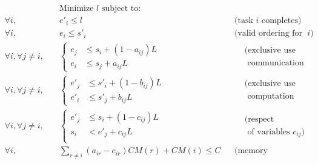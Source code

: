 \documentclass[sigconf]{acmart}
\begin{document}
	\vspace*{-0.5cm}
	\begin{align*}
		& \text{Minimize $l$ subject to:}\\
		\forall i, \quad & e'_i \leq l && \text{(task $i$ completes)}\\
		\forall i, \quad & e_i \leq s'_i&& \text{(valid ordering for task $i$)}\\
		\forall i, \forall j\ne i, \quad & \left\{\begin{aligned}
			e_j & \leq s_i +(1-a_{ij})L\\
			e_i & \leq s_j +a_{ij}L 
		\end{aligned} \right. &&
		\begin{aligned}
			&\text{(exclusive use of}\\
			&\text{  communication link)}
		\end{aligned}\\
		\forall i, \forall j\ne i, \quad & \left\{
		\begin{aligned}
			e'_j &\leq s'_i +(1-b_{ij})L\\
			e'_i &\leq s'_j +b_{ij}L
		\end{aligned}\right. && 
		\begin{aligned}
			&\text{(exclusive use of}\\
			&\text{  computation resource)}
		\end{aligned}\\
		\forall i, \forall j\ne i, \quad &\left\{
		\begin{aligned}
			e'_j &\leq s_i +(1-c_{ij})L\\
			s_i  &< e'_j +c_{ij}L\\
		\end{aligned}\right.&&
		\begin{aligned}
			&\text{(respect ordering}\\
			&\text{ of variables $c_{ij}$)}
		\end{aligned}\\
		\forall i, \quad & \sum_{r\ne i} (a_{ir} - c_{ir})CM(r) + CM(i) \le C && \text{(memory constraint)}\\
	\end{align*} 
	
\end{document}
